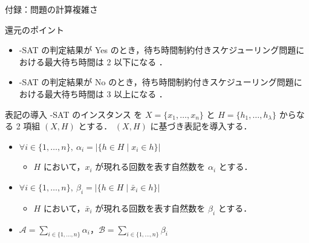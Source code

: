 \documentclass[dvipdfmx]{beamer}
\begin{document}
    \begin{frame}{付録：問題の計算複雑さ}
      \begin{block}{還元のポイント}
        \begin{itemize}
          \item {-SAT} の判定結果が \alert{Yes} のとき，待ち時間制約付きスケジューリング問題における最大待ち時間は \alert{2 以下}になる ．
          \item {-SAT} の判定結果が \alert{No} のとき，待ち時間制約付きスケジューリング問題における最大待ち時間は \alert{3 以上}になる ．
        \end{itemize}
      \end{block}
      \begin{block}{表記の導入}
        {-SAT} のインスタンス を $X = \{x_1,\ldots,x_n\}$ と $H = \{h_1,\ldots,h_{\lambda}\}$ からなる 2 項組 $(X,H)$ とする．
        $(X,H)$ に基づき表記を導入する．
        \begin{itemize}
          \item $\forall i \in \{1,\ldots,n\},~\alpha_i = |\{h \in H \mid x_i \in h\}|$
          \begin{itemize}
            \item $H$ において，$x_i$ が現れる回数を表す自然数を $\alpha_i$ とする．
          \end{itemize}
          \item $\forall i \in \{1,\ldots,n\},~\beta_i = |\{h \in H \mid \bar x_i \in h\}|$
          \begin{itemize}
            \item $H$ において，$\bar x_i$ が現れる回数を表す自然数を $\beta_i$ とする．
          \end{itemize}
          \item $\mathcal{A} = {\displaystyle \sum_{i \in \{1,\ldots,n\}}\alpha_i}$，$\mathcal{B} = {\displaystyle \sum_{i \in \{1,\ldots,n\}}\beta_i}$
        \end{itemize}
      \end{block}
    \end{frame}
\end{document}

